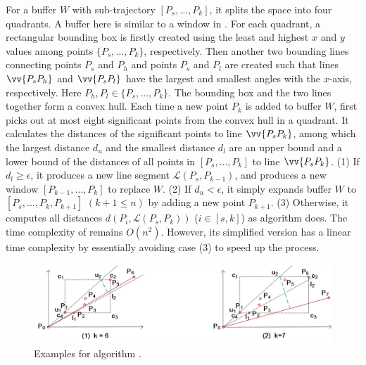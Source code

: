 For a buffer $W$ with sub-trajectory $[P_s, \ldots, P_k]$, it splits the space into four quadrants. A buffer here is similar to a window in \opwa \cite{Meratnia:Spatiotemporal}. For each quadrant, a rectangular bounding box is firstly created using the least and highest $x$ and $y$ values among points $\{P_s,\ldots,P_k\}$, respectively. Then another two bounding lines connecting points $P_s$ and $P_{h}$ and points $P_s$ and $P_{l}$ are created such that lines $\vv{P_sP_{h}}$ and $\vv{P_sP_{l}}$ have the largest and smallest angles with the $x$-axis, respectively.
Here $P_{h},P_{l} \in\{P_s,\ldots,P_k\}$. The bounding box and the two lines together form a convex hull.
Each time a new point $P_k$ is added to buffer $W$, \bqsa first picks out at most eight significant points from the convex hull in a quadrant. It calculates the distances of the significant points to line $\vv{P_sP_k}$, among which the largest distance $d_{u}$ and the smallest distance $d_l$ are an upper bound and  a lower bound of the distances of all points in $[P_s, \ldots, P_k]$ to line $\vv{P_sP_k}$.
(1) If $d_l\ge \epsilon$, it produces a new line segment $\mathcal{L}(P_{s}, P_{k-1})$, and produces a new window $[P_{k-1},\ldots,P_{k}]$ to replace $W$.
(2) If $d_u < \epsilon$, it simply expands buffer $W$ to $[P_s, \ldots, P_k, P_{k+1}]$ $(k+1\le n)$ by adding a new point $P_{k+1}$.
(3) Otherwise, it computes all distances $d(P_i, {\mathcal{L}(P_s,P_k)})$ ($i\in[s, k]$) as algorithm \dpa does.
%
The time complexity of \bqsa remains $O(n^2)$. However, its simplified version \fbqsa has a linear time complexity by essentially avoiding case (3) to speed up the process.


\begin{figure}[tb!]
	\centering
	\includegraphics[scale = 0.66]{Figures/Fig-BQS.jpg}
	\vspace{-1ex}
	\caption{{\small Examples for algorithm \bqsa.}}
	\label{fig:bqs}
	\vspace{-2ex}
\end{figure}


